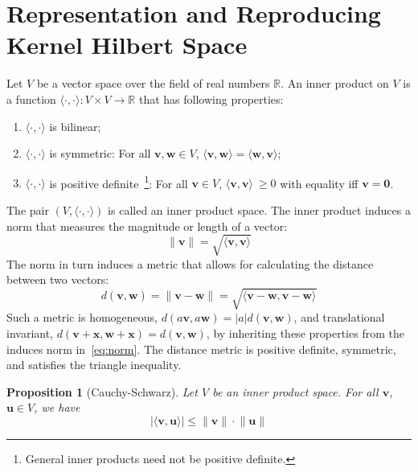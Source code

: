 \documentclass[conference]{IEEEtran}
\newtheorem{proposition}[theorem]{Proposition}
\begin{document}
\section{Representation and Reproducing Kernel Hilbert Space}
Let $V$ be a vector space over the field of real numbers $\mathbb{R}$. An inner product on $V$ is a function \mbox{$\langle\cdot,\cdot\rangle: V\times V \to \mathbb{R}$} that has following properties:
\begin{enumerate}
	\item $\langle\cdot,\cdot\rangle$ is bilinear;
	\item $\langle\cdot,\cdot\rangle$ is symmetric: For all $\mathbf{v}, \mathbf{w} \in V$,  $\langle\mathbf{v}, \mathbf{w}\rangle = \langle\mathbf{w}, \mathbf{v}\rangle$;
	\item $\langle\cdot,\cdot\rangle$ is positive definite~\footnote{General inner products need not be positive definite.}: For all $\mathbf{v} \in V$, $\langle\mathbf{v}, \mathbf{v}\rangle\ \geq 0$ with equality iff $\mathbf{v} = \mathbf{0}$.
\end{enumerate}
The pair $(V, \langle\cdot,\cdot\rangle)$ is called an inner product space. The inner product induces a norm that measures the magnitude or length of a vector:
\begin{equation}
\label{eq:norm}
	\lVert \mathbf{v} \rVert = \sqrt{\langle\mathbf{v}, \mathbf{v}\rangle}
\end{equation}
The norm in turn induces a metric that allows for calculating the distance between two vectors:
\begin{equation}
	d(\mathbf{v}, \mathbf{w}) = \lVert \mathbf{v} - \mathbf{w} \rVert = \sqrt{\langle\mathbf{v} - \mathbf{w}, \mathbf{v} - \mathbf{w}\rangle}
\end{equation}
Such a metric is homogeneous, $d(a \mathbf{v}, a \mathbf{w}) = |a| d(\mathbf{v}, \mathbf{w})$, and translational invariant, $d(\mathbf{v} + \mathbf{x}, \mathbf{w} + \mathbf{x}) = d(\mathbf{v}, \mathbf{w})$, by inheriting these properties from the induces norm in~\eqref{eq:norm}. The distance metric is positive definite, symmetric, and satisfies the triangle inequality.

\begin{proposition}[Cauchy-Schwarz]
Let $V$ be an inner product space. For all $\mathbf{v}$, $\mathbf{u} \in V$, we have
\begin{equation}
\label{eq:csinq}
	|\langle\mathbf{v}, \mathbf{u}\rangle| \leq \lVert \mathbf{v} \rVert \cdot \lVert \mathbf{u} \rVert
\end{equation}
\end{proposition}
\end{document}
